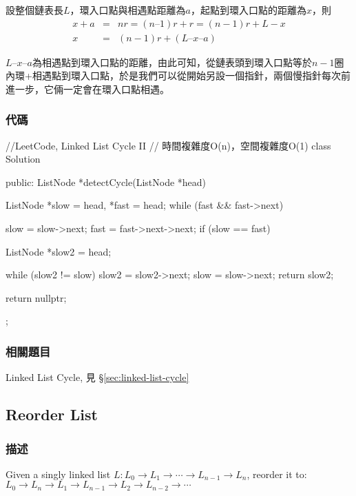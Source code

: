 設整個鏈表長$L$，環入口點與相遇點距離為$a$，起點到環入口點的距離為$x$，則
\begin{eqnarray}
x + a &=& nr = (n – 1)r +r = (n-1)r + L - x \nonumber \\
x &=& (n-1)r + (L – x – a) \nonumber
\end{eqnarray}

$L – x – a$為相遇點到環入口點的距離，由此可知，從鏈表頭到環入口點等於$n-1$圈內環+相遇點到環入口點，於是我們可以從開始另設一個指針，兩個慢指針每次前進一步，它倆一定會在環入口點相遇。


\subsubsection{代碼}
\begin{Code}
//LeetCode, Linked List Cycle II
// 時間複雜度O(n)，空間複雜度O(1)
class Solution {
public:
    ListNode *detectCycle(ListNode *head) {
        ListNode *slow = head, *fast = head;
        while (fast && fast->next) {
            slow = slow->next;
            fast = fast->next->next;
            if (slow == fast) {
                ListNode *slow2 = head;

                while (slow2 != slow) {
                    slow2 = slow2->next;
                    slow = slow->next;
                }
                return slow2;
            }
        }
        return nullptr;
    }
};
\end{Code}


\subsubsection{相關題目}
\begindot
\item Linked List Cycle, 見 \S \ref{sec:linked-list-cycle}
\myenddot


\subsection{Reorder List}
\label{sec:reorder-list}


\subsubsection{描述}
Given a singly linked list $L: L_0 \rightarrow L_1 \rightarrow \cdots \rightarrow L_{n-1} \rightarrow L_n$,
reorder it to: $L_0 \rightarrow L_n \rightarrow L_1 \rightarrow L_{n-1} \rightarrow L_2 \rightarrow L_{n-2} \rightarrow \cdots$

